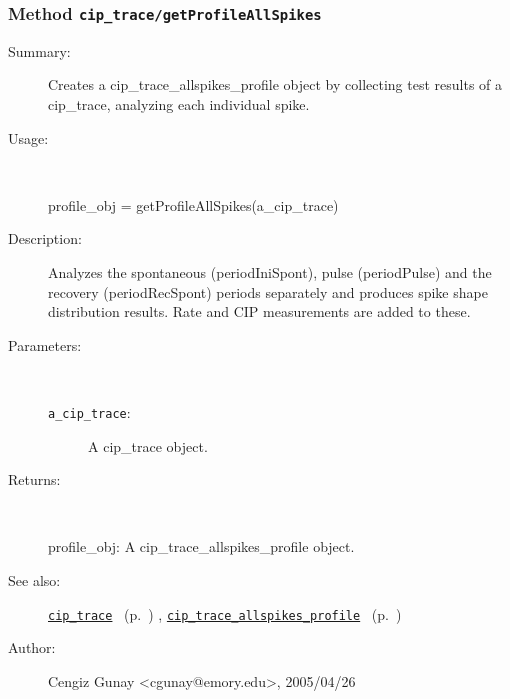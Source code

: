 \subsubsection[Method \texttt{getProfileAllSpikes}]{Method \texttt{cip\_trace/getProfileAllSpikes}}%
%
\label{ref_cip_trace__getProfileAllSpikes}%
\hypertarget{ref_cip_trace__getProfileAllSpikes}{}%
\begin{description}
\item[Summary:]Creates a cip\_trace\_allspikes\_profile object by collecting test results of a cip\_trace, analyzing each individual spike.
%
\item[Usage:]~%
\begin{lyxcode}%
profile\_obj = getProfileAllSpikes(a\_cip\_trace)
%
\end{lyxcode}%
%
\item[Description:]%
Analyzes the spontaneous (periodIniSpont), pulse (periodPulse) and the
 recovery (periodRecSpont) periods separately and produces spike shape
 distribution results. Rate and CIP measurements are added to these.
\item[Parameters:]~
\begin{description}%
\item[\texttt{a\_cip\_trace}:]
 A cip\_trace object.
\end{description}%
%
\item[Returns:
]~

	profile\_obj: A cip\_trace\_allspikes\_profile object.
%
%
\item[See also:]%
\hyperlink{ref_cip_trace}{\texttt{cip\_trace}}%
\ (p.~\pageref{ref_cip_trace})%
%
, \hyperlink{ref_cip_trace_allspikes_profile}{\texttt{cip\_trace\_allspikes\_profile}}%
\ (p.~\pageref{ref_cip_trace_allspikes_profile})%
%
%
\item[Author:]%
Cengiz Gunay <cgunay@emory.edu>, 2005/04/26
%
\end{description}
\methodline%
